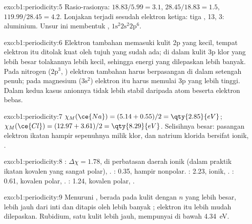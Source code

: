 \begin{solution}{exo:b1:periodicity:5}
Rasio-rasionya: $18.83/5.99 = 3.1$, $28.45/18.83 = 1.5$,
$119.99/28.45 = 4.2$. Lonjakan terjadi sesudah elektron ketiga: tiga
,  13,  3: aluminium. Unsur ini membentuk
, $1\text{s}^2 2\text{s}^2
2\text{p}^6$.
\end{solution}

\begin{solution}{exo:b1:periodicity:6}
Elektron tambahan  memasuki kulit 2p yang kecil, tempat elektron
itu ditolak kuat oleh tujuh  yang sudah ada; di dalam
kulit 3p klor yang lebih besar tolakannya lebih kecil, sehingga energi
yang dilepaskan lebih banyak. Pada nitrogen ($2\text{p}^3$,
) elektron tambahan harus berpasangan di dalam 
setengah penuh; pada magnesium ($3\text{s}^2$) elektron itu harus
memulai  3p yang lebih tinggi. Dalam kedua kasus anionnya tidak
lebih stabil daripada atom beserta elektron bebas.
\end{solution}

\begin{solution}{exo:b1:periodicity:7}
$\chi_M(\ce{Na}) = (5.14 + 0.55)/2 = \qty{2.85}{eV}$; $\chi_M(\ce{Cl}) =
(12.97 + 3.61)/2 = \qty{8.29}{eV}$. Selisihnya besar: pasangan elektron
ikatan  hampir sepenuhnya milik klor, dan natrium klorida
bersifat ionik, .
\end{solution}

\begin{solution}{exo:b1:periodicity:8}
: $\Delta\chi = 1.78$, di perbatasan daerah ionik (dalam praktik
ikatan kovalen yang sangat polar), . : 0.35,
hampir nonpolar. : 2.23, ionik, . : 0.61,
kovalen polar, . : 1.24, kovalen
polar, .
\end{solution}

\begin{solution}{exo:b1:periodicity:9}
Menuruni ,  berada pada kulit dengan $n$ yang
lebih besar, lebih jauh dari inti dan ditapis oleh lebih banyak ; elektron itu lebih mudah dilepaskan. Rubidium, satu kulit lebih
jauh, mempunyai  di bawah \qty{4.34}{eV}.
\end{solution}

